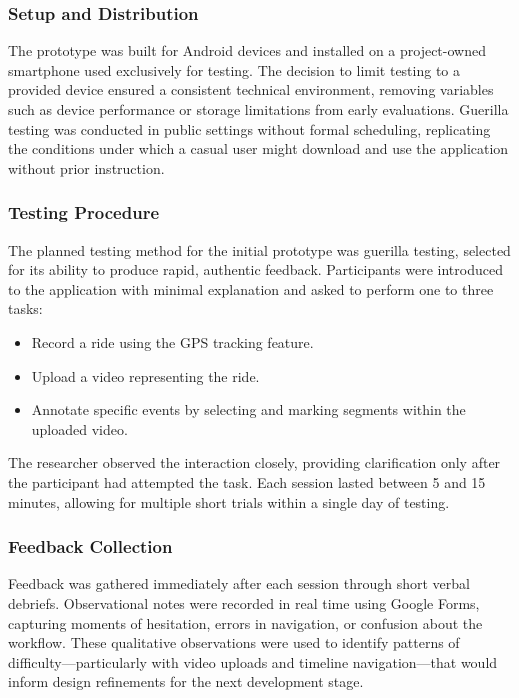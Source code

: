 \subsubsection{Setup and Distribution}

The prototype was built for Android devices and installed on a project-owned smartphone used exclusively for testing. The decision to limit testing to a provided device ensured a consistent technical environment, removing variables such as device performance or storage limitations from early evaluations. Guerilla testing was conducted in public settings without formal scheduling, replicating the conditions under which a casual user might download and use the application without prior instruction.

\subsubsection{Testing Procedure}

The planned testing method for the initial prototype was guerilla testing, selected for its ability to produce rapid, authentic feedback. Participants were introduced to the application with minimal explanation and asked to perform one to three tasks:

\begin{itemize}
    \item Record a ride using the GPS tracking feature.
    \item Upload a video representing the ride.
    \item Annotate specific events by selecting and marking segments within the uploaded video.
\end{itemize}

The researcher observed the interaction closely, providing clarification only after the participant had attempted the task. Each session lasted between 5 and 15 minutes, allowing for multiple short trials within a single day of testing.

\subsubsection{Feedback Collection}
Feedback was gathered immediately after each session through short verbal debriefs. Observational notes were recorded in real time using Google Forms, capturing moments of hesitation, errors in navigation, or confusion about the workflow. These qualitative observations were used to identify patterns of difficulty—particularly with video uploads and timeline navigation—that would inform design refinements for the next development stage.

